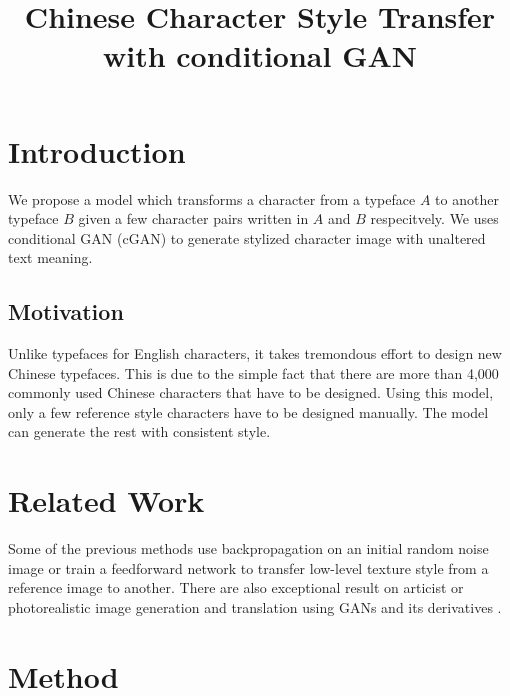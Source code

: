\documentclass[10pt,twocolumn,letterpaper]{article}
\begin{document}
\title{Chinese Character Style Transfer with conditional GAN}  %

\maketitle
\thispagestyle{empty}


\section{Introduction}

We propose a model which transforms a character from a typeface $A$ to another typeface $B$ given a few character pairs written in $A$ and $B$ respecitvely. We uses conditional GAN (cGAN) \cite{Authors01} to generate stylized character image with unaltered text meaning.


\subsection{Motivation}
Unlike typefaces for English characters, it takes tremondous effort to design new Chinese typefaces. This is due to the simple fact that there are more than 4,000 commonly used Chinese characters \cite{Authors02} that have to be designed. Using this model, only a few reference style characters have to be designed manually. The model can generate the rest with consistent style. 

\section{Related Work}

Some of the previous methods use backpropagation on an initial random noise image \cite{Authors03} or train a feedforward network \cite{Authors04} to transfer low-level texture style from a reference image to another. There are also exceptional result on articist or photorealistic image generation and translation using GANs and its derivatives \cite{Authors05}\cite{Authors06}. 

\section{Method}
\end{document}
